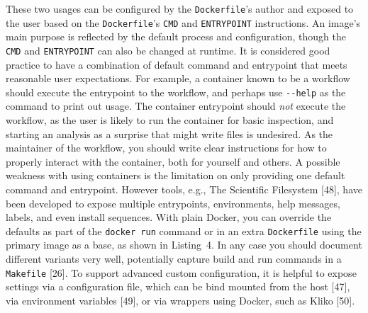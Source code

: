 \documentclass[10pt,letterpaper]{article}
\newenvironment{Shaded}{\begin{snugshade}}{\end{snugshade}}
\newcommand{\CommentTok}[1]{\textcolor[rgb]{0.56,0.35,0.01}{\textit{#1}}}
\newcommand{\KeywordTok}[1]{\textcolor[rgb]{0.13,0.29,0.53}{\textbf{#1}}}
\newcommand{\NormalTok}[1]{#1}
\newcommand{\StringTok}[1]{\textcolor[rgb]{0.31,0.60,0.02}{#1}}
\begin{document}
These two usages can be configured by the \texttt{Dockerfile}'s author
and exposed to the user based on the \texttt{Dockerfile}'s \texttt{CMD}
and \texttt{ENTRYPOINT} instructions. An image's main purpose is
reflected by the default process and configuration, though the
\texttt{CMD} and \texttt{ENTRYPOINT} can also be changed at runtime. It
is considered good practice to have a combination of default command and
entrypoint that meets reasonable user expectations. For example, a
container known to be a workflow should execute the entrypoint to the
workflow, and perhaps use \texttt{-\/-help} as the command to print out
usage. The container entrypoint should \emph{not} execute the workflow,
as the user is likely to run the container for basic inspection, and
starting an analysis as a surprise that might write files is undesired.
As the maintainer of the workflow, you should write clear instructions
for how to properly interact with the container, both for yourself and
others. A possible weakness with using containers is the limitation on
only providing one default command and entrypoint. However tools, e.g.,
The Scientific Filesystem {[}48{]}, have been developed to expose
multiple entrypoints, environments, help messages, labels, and even
install sequences. With plain Docker, you can override the defaults as
part of the \texttt{docker\ run} command or in an extra
\texttt{Dockerfile} using the primary image as a base, as shown in
Listing~4. In any case you should document different variants very well,
potentially capture build and run commands in a \texttt{Makefile}
{[}26{]}. To support advanced custom configuration, it is helpful to
expose settings via a configuration file, which can be bind mounted from
the host {[}47{]}, via environment variables {[}49{]}, or via wrappers
using Docker, such as Kliko {[}50{]}.

\footnotesize

\begin{Shaded}
\end{Shaded}

\begin{Shaded}
\end{Shaded}
\end{document}
